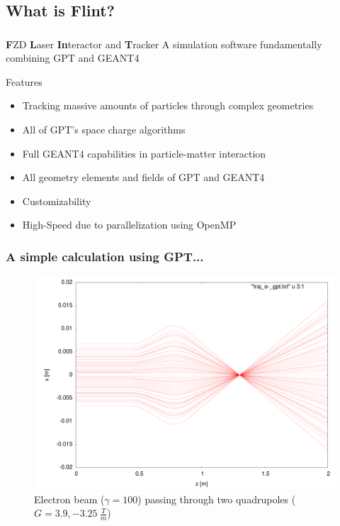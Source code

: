 \documentclass{beamer}
\newcommand{\ident}{\thesection.\thesubsection}
\newcommand{\mysubsection}[1]{\subsection{#1}\label{\ident}}
\newcommand{\ftitle}{\frametitle{\nameref{\ident}}}
\newcommand{\geant}{G{\smaller EANT}4 }
\begin{document}
\mysubsection{What is Flint?}

\begin{frame}
	\ftitle
	\begin{block}{\textbf{F}ZD \textbf{L}aser \textbf{In}teractor and \textbf{T}racker}
			A simulation software fundamentally combining GPT and \geant
	\end{block}
	\pause
	\begin{exampleblock}{Features}
		\begin{itemize}
			\item Tracking massive amounts of particles through complex geometries
			\item All of GPT's space charge algorithms
			\item Full \geant capabilities in particle-matter interaction
			\item All geometry elements and fields of GPT and \geant
			\item Customizability
			\item High-Speed due to parallelization using OpenMP
		\end{itemize}
	\end{exampleblock}
\end{frame}

\begin{frame}
	\frametitle{A simple calculation using GPT...}
	\begin{figure}
		\begin{center}
			\includegraphics[height=0.7\textheight]{img/quadrupole_gpt}
			\caption{Electron beam ($\gamma = 100$) passing through two quadrupoles ($G = 3.9, -3.25 ~\frac{T}{m}$)}
		\end{center}
	\end{figure}
\end{frame}
\end{document}
